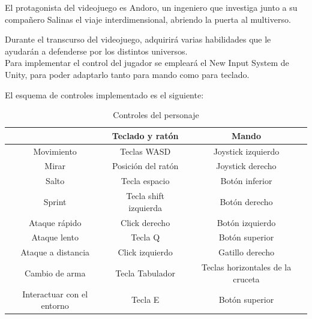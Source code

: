 \documentclass[12pt,spanish]{article}
\begin{document}
    El protagonista del videojuego es Andoro, un ingeniero que investiga junto a su compañero Salinas el viaje interdimensional, abriendo la puerta al multiverso.

    Durante el transcurso del videojuego, adquirirá varias habilidades que le ayudarán a defenderse por los distintos universos.\\

    Para implementar el control del jugador se empleará el New Input System de Unity, para poder adaptarlo tanto para mando como para teclado.

    El esquema de controles implementado es el siguiente:

\begin{table}[!h]
\centering
\begin{tabular}{c|c|c|}
\cline{2-3}
                                                 & Teclado y ratón       & Mando              \\ \hline
\multicolumn{1}{|c|}{Movimiento}                 & Teclas WASD           & Joystick izquierdo                   \\ \hline
\multicolumn{1}{|c|}{Mirar}                      & Posición del ratón    & Joystick derecho                     \\ \hline
\multicolumn{1}{|c|}{Salto}                      & Tecla espacio         & Botón inferior                       \\ \hline
\multicolumn{1}{|c|}{Sprint}                     & Tecla shift izquierda & Botón derecho                        \\ \hline
\multicolumn{1}{|c|}{Ataque rápido}              & Click derecho         & Botón izquierdo                      \\ \hline
\multicolumn{1}{|c|}{Ataque lento}               & Tecla Q               & Botón superior                       \\ \hline
\multicolumn{1}{|c|}{Ataque a distancia}         & Click izquierdo       & Gatillo derecho                      \\ \hline
\multicolumn{1}{|c|}{Cambio de arma}             & Tecla Tabulador        & Teclas horizontales de la cruceta    \\ \hline
\multicolumn{1}{|c|}{Interactuar con el entorno} & Tecla E               & Botón superior                       \\ \hline
\end{tabular}
\caption{Controles del personaje}
\end{table}
\end{document}
